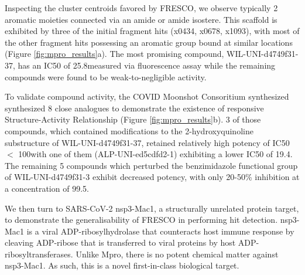 
Inspecting the cluster centroids favored by FRESCO, we observe typically 2 aromatic moieties connected via an amide or amide isostere. This scaffold is exhibited by three of the initial fragment hits (x0434, x0678, x1093), with most of the other fragment hits possessing an aromatic group bound at similar locations (Figure \ref{fig:mpro_results}a). The most promising compound, WIL-UNI-d4749f31-37, has an IC50 of 25.8\uM measured via fluorescence assay while the remaining compounds were found to be weak-to-negligible activity.

To validate compound activity, the COVID Moonshot Consoritium synthesized synthesized 8 close analogues to demonstrate the existence of responsive Structure-Activity Relationship \cite{Hermann2013ZincImpurity, Morreale2017ZincImpurity} (Figure \ref{fig:mpro_results}b). 3 of those compounds, which contained modifications to the 2-hydroxyquinoline substructure of WIL-UNI-d4749f31-37, retained relatively high potency of IC50 $<$ 100\uM with one of them (ALP-UNI-ed5cdfd2-1) exhibiting a lower IC50 of 19.4\uM. The remaining 5 compounds which perturbed the benzimidazole functional group of WIL-UNI-d4749f31-3 exhibit decreased potency, with only 20-50\% inhibition at a concentration of 99.5\uM.


We then turn to SARS-CoV-2 nsp3-Mac1, a structurally unrelated protein target, to demonstrate the generalisability of FRESCO in performing hit detection. nsp3-Mac1 is a viral ADP-ribosylhydrolase that counteracts host immune response by cleaving ADP-ribose that is transferred to viral proteins by host ADP-ribosyltransferases. Unlike Mpro, there is no potent chemical matter against nsp3-Mac1. As such, this is a novel first-in-class biological target. 

